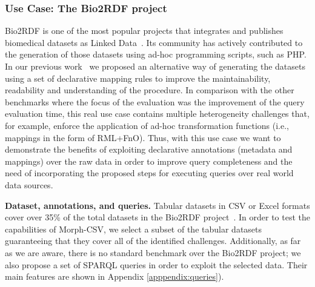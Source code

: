 \subsubsection{Use Case: The Bio2RDF project}
Bio2RDF is one of the most popular projects that integrates and publishes biomedical datasets as Linked Data~\cite{belleau2008bio2rdf}. Its community has actively contributed to the generation of those datasets using ad-hoc programming scripts, such as PHP. In our previous work~\cite{iglesias2019enhancing} we proposed an alternative way of generating the datasets using a set of declarative mapping rules to improve the maintainability, readability and understanding of the procedure. In comparison with the other benchmarks where the focus of the evaluation was the improvement of the query evaluation time, this real use case contains multiple heterogeneity challenges that, for example, enforce the application of ad-hoc transformation functions (i.e., mappings in the form of RML+FnO). Thus, with this use case we want to demonstrate the benefits of exploiting declarative annotations (metadata and mappings) over the raw data in order to improve query completeness and the need of incorporating the proposed steps for executing queries over real world data sources.

\noindent\textbf{Dataset, annotations, and queries.} Tabular datasets in  CSV or Excel formats cover over 35\% of the total datasets in the Bio2RDF project~\cite{iglesias2019enhancing}. In order to test the capabilities of Morph-CSV, we select a subset of the tabular datasets guaranteeing that they cover all of the identified challenges. Additionally, as far as we are aware, there is no standard benchmark over the Bio2RDF project; we also propose a set of SPARQL queries in order to exploit the selected data. Their main features are shown in Appendix \ref{apppendix:queries}). 


